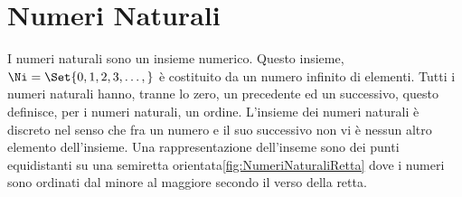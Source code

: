 \chapter{Numeri Naturali}
\label{cha:NumeriNaturali}
I numeri naturali   sono un insieme numerico.  Questo insieme, $\Ni=\Set{0,1,2,3,\dots,}$ è  costituito da un numero infinito di elementi. Tutti i numeri naturali hanno, tranne lo zero, un precedente ed un successivo, questo definisce, per i numeri naturali, un ordine.  L'insieme dei numeri naturali è discreto nel senso che fra un numero e il suo successivo non vi è nessun altro elemento dell'insieme. Una rappresentazione dell'inseme  sono dei punti equidistanti su una semiretta orientata\nobs\vref{fig:NumeriNaturaliRetta} dove i numeri sono ordinati dal minore al maggiore secondo il verso della retta. 
